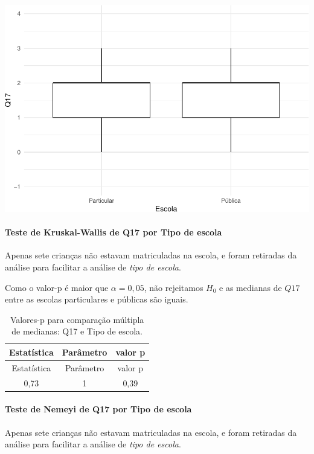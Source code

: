 \documentclass[]{article}
\let\oldparagraph\paragraph
\renewcommand{\paragraph}[1]{\oldparagraph{#1}\mbox{}}
\begin{document}
\begin{center}\includegraphics[width=0.75\linewidth]{relatorio_files/figure-latex/unnamed-chunk-213-1} \end{center}

\hypertarget{teste-de-kruskal-wallis-de-q17-por-tipo-de-escola}{%
\paragraph{Teste de Kruskal-Wallis de Q17 por Tipo de escola}\label{teste-de-kruskal-wallis-de-q17-por-tipo-de-escola}}

Apenas sete crianças não estavam matriculadas na escola, e foram retiradas da análise para facilitar a análise de \emph{tipo de escola}.

Como o valor-p é maior que \(\alpha=0,05\), não rejeitamos \(H_0\) e as medianas de \(Q17\) entre as escolas particulares e públicas são iguais.

\begin{longtable}[]{@{}ccc@{}}
\caption{\label{tab:unnamed-chunk-214}Valores-p para comparação múltipla de medianas: Q17 e Tipo de escola.}\tabularnewline
\toprule
Estatística & Parâmetro & valor p\tabularnewline
\midrule
\endfirsthead
\toprule
Estatística & Parâmetro & valor p\tabularnewline
\midrule
\endhead
0,73 & 1 & 0,39\tabularnewline
\bottomrule
\end{longtable}

\hypertarget{teste-de-nemeyi-de-q17-por-tipo-de-escola}{%
\paragraph{Teste de Nemeyi de Q17 por Tipo de escola}\label{teste-de-nemeyi-de-q17-por-tipo-de-escola}}

Apenas sete crianças não estavam matriculadas na escola, e foram retiradas da análise para facilitar a análise de \emph{tipo de escola}.
\end{document}
